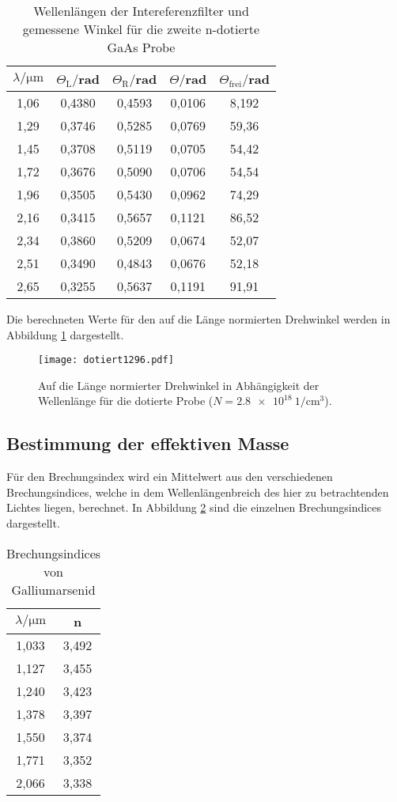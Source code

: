 \begin{table}[H]
  \centering
  \caption{Wellenlängen der Intereferenzfilter und gemessene Winkel für die zweite n-dotierte GaAs Probe}
  \label{tab:zweite}
  \begin{tabular}{c c c c c}
    \toprule
    $\lambda/\mathrm{\mu m}$ & $\Theta_{\mathrm{L}}/$rad & $\Theta_{\mathrm{R}}/$rad  & $\Theta /$rad & $\Theta_{\mathrm{frei}}/$rad\\
    \midrule
    1,06  & 0,4380 & 0,4593 & 0,0106 & 8,192 \\
    1,29  & 0,3746 & 0,5285 & 0,0769 & 59,36 \\
    1,45  & 0,3708 & 0,5119 & 0,0705 & 54,42 \\
    1,72  & 0,3676 & 0,5090 & 0,0706 & 54,54 \\
    1,96  & 0,3505 & 0,5430 & 0,0962 & 74,29 \\
    2,16  & 0,3415 & 0,5657 & 0,1121 & 86,52 \\
    2,34  & 0,3860 & 0,5209 & 0,0674 & 52,07 \\
    2,51  & 0,3490 & 0,4843 & 0,0676 & 52,18 \\
    2,65  & 0,3255 & 0,5637 & 0,1191 & 91,91 \\
    \bottomrule
  \end{tabular}
\end{table}


Die berechneten Werte für den auf die Länge normierten Drehwinkel werden
in Abbildung \ref{fig:rein} dargestellt.
\begin{figure}[H]
  \centering
  \texttt{[image: dotiert1296.pdf]}
  \caption{Auf die Länge normierter Drehwinkel in Abhängigkeit der Wellenlänge für die dotierte Probe ($N = \SI{2.8e18}{1\per\centi\meter^3}$).}
  \label{fig:rein}
\end{figure}


\subsection{Bestimmung der effektiven Masse}
Für den Brechungsindex wird ein Mittelwert aus den verschiedenen Brechungsindices,
welche in dem Wellenlängenbreich des hier zu betrachtenden Lichtes liegen, berechnet. In Abbildung \ref{tab:Brechung}
sind die einzelnen Brechungsindices dargestellt.

\begin{table}[H]
  \centering
  \caption{Brechungsindices von Galliumarsenid}
  \label{tab:Brechung}
  \begin{tabular}{c c}
    \toprule
    $\lambda/\mathrm{\mu m}$ & n\\
    \midrule
    1,033  & 3,492 \\
    1,127  & 3,455 \\
    1,240  & 3,423 \\
    1,378  & 3,397 \\
    1,550  & 3,374 \\
    1,771  & 3,352 \\
    2,066  & 3,338 \\
    \bottomrule
  \end{tabular}
\end{table}

